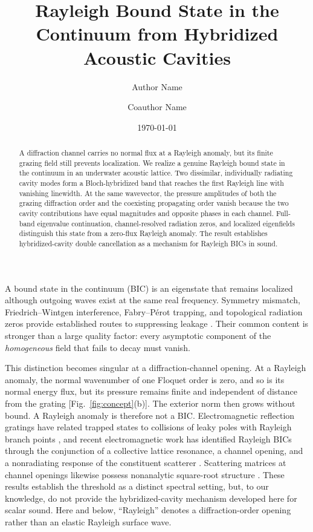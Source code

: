 \documentclass[aps,prl,reprint,superscriptaddress,nofootinbib,floatfix]{revtex4-2}
\begin{document}
\title{Rayleigh Bound State in the Continuum from Hybridized Acoustic Cavities}
\author{Author Name}
\author{Coauthor Name}
\date{\today}

\begin{abstract}
A diffraction channel carries no normal flux at a Rayleigh anomaly, but its
finite grazing field still prevents localization.  We realize a genuine
Rayleigh bound state in the continuum in an underwater acoustic lattice.  Two
dissimilar, individually radiating cavity modes form a Bloch-hybridized band
that reaches the first Rayleigh line with vanishing linewidth.  At the same
wavevector, the pressure amplitudes of both the grazing diffraction order and
the coexisting propagating order vanish because the two cavity contributions
have equal magnitudes and opposite phases in each channel.  Full-band
eigenvalue continuation, channel-resolved radiation zeros, and localized
eigenfields distinguish this state from a zero-flux Rayleigh anomaly.  The
result establishes hybridized-cavity double cancellation as a mechanism for
Rayleigh BICs in sound.
\end{abstract}

\maketitle

A bound state in the continuum (BIC) is an eigenstate that remains localized
although outgoing waves exist at the same real frequency.  Symmetry mismatch,
Friedrich--Wintgen interference, Fabry--P\'erot trapping, and topological
radiation zeros provide established routes to suppressing leakage
\cite{Friedrich1985,Hsu2016,Hsu2013,Yang2014,Zhen2014}.  Their common content is
stronger than a large quality factor: every asymptotic component of the
\emph{homogeneous} field that fails to decay must vanish.

This distinction becomes singular at a diffraction-channel opening.  At a
Rayleigh anomaly, the normal wavenumber of one Floquet order is zero, and so
is its normal energy flux, but its pressure remains finite and independent of
distance from the grating [Fig.~\ref{fig:concept}(b)].  The exterior norm then
grows without bound.  A Rayleigh anomaly is therefore not a BIC.
Electromagnetic reflection gratings have related trapped states to collisions
of leaky poles with Rayleigh branch points \cite{Monticone2017}, and recent
electromagnetic work has identified Rayleigh BICs through the conjunction of a
collective lattice resonance, a channel opening, and a nonradiating response
of the constituent scatterer \cite{Karavaev2026}.  Scattering matrices at
channel openings likewise possess nonanalytic square-root structure
\cite{Wojcik2021}.  These results establish the threshold as a distinct
spectral setting, but, to our knowledge, do not provide the
hybridized-cavity mechanism developed here for scalar sound.  Here and below,
``Rayleigh'' denotes a diffraction-order opening rather than an elastic
Rayleigh surface wave.
\end{document}
